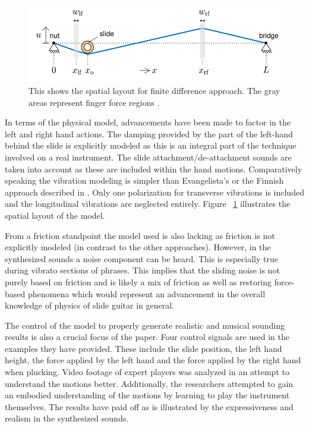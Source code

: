 \documentclass[main.tex]{subfiles}
\begin{document}
\begin{figure}[h]
    \centering
    \includegraphics[scale=.75]{./images/diagrams/FDModel.png}
    \caption{This shows the spatial layout for finite difference approach. The gray areas represent finger force regions .}
    \label{fig:FDModel}
\end{figure}

In terms of the physical model, advancements have been made to factor in the left and right hand actions. The damping provided by the part of the left-hand behind the slide is explicitly modeled as this is an integral part of the technique involved on a real instrument. The slide attachment/de-attachment sounds are taken into account as these are included within the hand motions. Comparatively speaking the vibration modeling is simpler than Evangelista's or the Finnish approach described in . Only one polarization for transverse vibrations is included and the longitudinal vibrations are neglected entirely. Figure~ \ref{fig:FDModel} illustrates the spatial layout of the model.

From a friction standpoint the model used is also lacking as friction is not explicitly modeled (in contrast to the other approaches). However, in the synthesized sounds a noise component can be heard. This is especially true during vibrato sections of phrases. This implies that the sliding noise is not purely based on friction and is likely a mix of friction as well as restoring force-based phenomena which would represent an advancement in the overall knowledge of physics of slide guitar in general.

The control of the model to properly generate realistic and musical sounding results is also a crucial focus of the paper. Four control signals are used in the examples they have provided. These include the slide position, the left hand height, the force applied by the left hand and the force applied by the right hand when plucking. Video footage of expert players was analyzed in an attempt to understand the motions better. Additionally, the researchers attempted to gain an embodied understanding of the motions by learning to play the instrument themselves. The results have paid off as is illustrated by the expressiveness and realism in the synthesized sounds.
\end{document}
